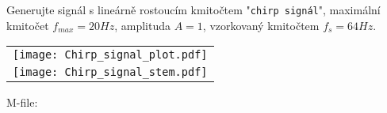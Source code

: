 \begin{example}
  Generujte signál s lineárně rostoucím kmitočtem "\texttt{chirp signál}", maximální kmitočet
  $f_{max} = 20 Hz$, amplituda $A = 1$, vzorkovaný kmitočtem $f_s = 64 Hz$.

    {\centering
     \begin{tabular}{c}
         \texttt{[image: Chirp\_signal\_plot.pdf]}  \\
         \texttt{[image: Chirp\_signal\_stem.pdf]} 
     \end{tabular}  
  \par}
  
  M-file:
  
  \begin{lstlisting}[caption=\texttt{gen\_chirp\_signal.m}. Generuje chirp signál]
  \end{lstlisting}
\end{example}